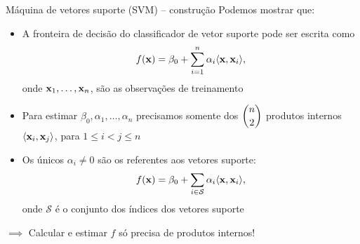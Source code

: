 \begin{frame}{Máquina de vetores suporte (SVM) -- construção}
    Podemos mostrar que:
    \begin{itemize}
        \item A fronteira de decisão do classificador de vetor suporte pode ser escrita como $$f({\bf x}) = \beta_0 + \sum_{i = 1}^{n} \alpha_i \langle {\bf x}, {\bf x}_i\rangle,$$ onde ${\bf x}_1, \dots, {\bf x}_n$, são as observações de treinamento
        
        \pause
        
        \item Para estimar $\beta_0, \alpha_1, \dots, \alpha_n$ precisamos somente dos $\displaystyle \binom{n}{2}$ produtos internos $\langle {\bf x}_i, {\bf x}_j \rangle$, para $1 \leq i < j \leq n$
        
        \pause
        
        \item Os únicos $\alpha_i \neq 0$ são os referentes aos vetores suporte: \pause $$f({\bf x}) = \beta_0 + \sum_{i \in \mathcal{S}} \alpha_i \langle {\bf x}, {\bf x}_i\rangle,$$ onde $\mathcal{S}$ é o conjunto dos índices dos vetores suporte
    \end{itemize}
    
    \pause
    
    \begin{center}
        $\implies$ Calcular e estimar $f$ só precisa de produtos internos!
    \end{center}
\end{frame}



